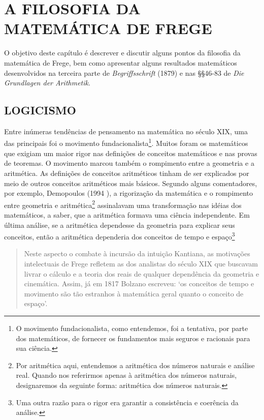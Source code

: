 \artigofalse
\chapter{A FILOSOFIA DA MATEMÁTICA DE FREGE}

O objetivo deste capítulo é descrever e discutir alguns pontos da filosofia da matemática de Frege, bem como apresentar alguns resultados matemáticos desenvolvidos na terceira parte de \textit{Begriffsschrift} (1879\nocite{Frege1998}) e nas §§46-83 de \textit{Die Grundlagen der Arithmetik}.

\section{LOGICISMO}

Entre inúmeras tendências de pensamento na matemática no século XIX, uma das principais foi o movimento fundacionalista\footnote{O movimento fundacionalista, como entendemos, foi a tentativa, por parte dos matemáticos, de fornecer os fundamentos mais seguros e racionais para sua ciência.}. Muitos foram os matemáticos que exigiam um maior rigor nas definições de conceitos matemáticos e nas provas de teoremas. O movimento marcou também o rompimento entre a geometria e a aritmética. As definições de conceitos aritméticos tinham de ser explicados por meio de outros conceitos aritméticos mais básicos. Segundo alguns comentadores, por exemplo, Demopoulos (1994 \nocite{Demopoulos1995a}\nocite{Demopoulos1995}), a rigorização da matemática e o rompimento entre geometria e aritmética\footnote{Por aritmética aqui, entendemos a aritmética dos números naturais e análise real. Quando nos referirmos apenas à aritmética dos números naturais, designaremos da seguinte forma: aritmética dos números naturais.} assinalavam uma transformação nas idéias dos matemáticos, a saber, que a aritmética formava uma ciência independente. Em última análise, se a aritmética dependesse da geometria para explicar seus conceitos, então a aritmética dependeria dos conceitos de tempo e espaço\footnote{Uma outra razão para o rigor era garantir a consistência e coerência da análise.} 

\begin{quote}
Neste aspecto o combate à incursão da intuição Kantiana, as motivações intelectuais de Frege refletem as dos analistas do século XIX que buscavam livrar o cálculo e a teoria dos reais de qualquer dependência da geometria e cinemática. Assim, já em 1817 Bolzano escreveu: ‘os conceitos de tempo e movimento são tão estranhos à matemática geral quanto o conceito de espaço’.\cite[p. 76]{Demopoulos1995a}
\end{quote}
